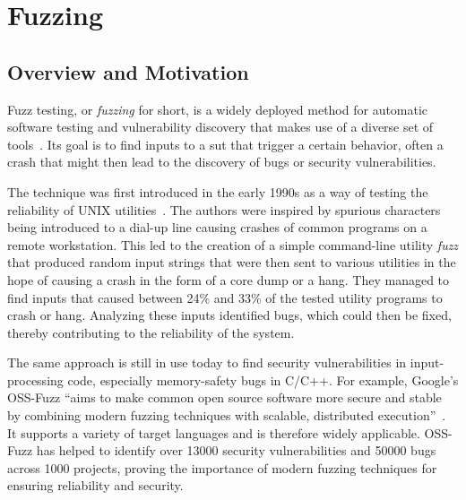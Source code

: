 
\section{Fuzzing}\label{sec:fuzzing}


\subsection{Overview and Motivation}\label{sec:fuzzing-overview}

Fuzz testing, or \textit{fuzzing} for short, is a widely deployed method for automatic
software testing and vulnerability discovery that makes use of a diverse set of
tools~\cite{manes_art_2019}.
Its goal is to find inputs to a \gls{sut} that trigger a certain
behavior, often a crash that might then lead to the discovery of bugs or security
vulnerabilities.

The technique was first introduced in the early 1990s as a way of testing the
reliability of UNIX utilities~\cite{miller_empirical_1990}.
The authors were inspired by spurious characters being introduced to a dial-up
line causing crashes of common programs on a remote workstation.
This led to the creation of a simple command-line utility \emph{fuzz} that produced
random input strings that were then sent to various utilities in the hope of causing
a crash in the form of a core dump or a hang.
They managed to find inputs that caused between 24\% and 33\% of the tested
utility programs to crash or hang.
Analyzing these inputs identified bugs, which could then be fixed, thereby
contributing to the reliability of the system.

The same approach is still in use today to find security vulnerabilities in
input-processing code, especially memory-safety bugs in C/C++.
For example, Google's OSS-Fuzz
\enquote{aims to make common open source software more secure and stable by combining
modern fuzzing techniques with scalable, distributed execution}~\cite{arya_oss-fuzz_nodate}.
It supports a variety of target languages and is therefore widely applicable.
OSS-Fuzz has helped to identify over \num{13000} security vulnerabilities and \num{50000} bugs across
\num{1000} projects, proving the importance of modern fuzzing techniques for ensuring reliability and security.


